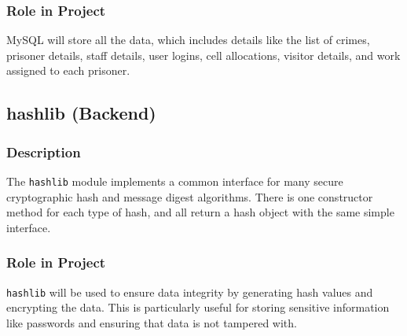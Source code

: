 \subsubsection{Role in Project}
MySQL will store all the data, which includes details like the list of crimes, prisoner details, staff details, user logins, cell allocations, visitor details, and work assigned to each prisoner.

\subsection*{hashlib (Backend)}

\subsubsection{Description}
The \texttt{hashlib} module implements a common interface for many secure cryptographic hash and message digest algorithms. There is one constructor method for each type of hash, and all return a hash object with the same simple interface.

\subsubsection{Role in Project}
\texttt{hashlib} will be used to ensure data integrity by generating hash values and encrypting the data. This is particularly useful for storing sensitive information like passwords and ensuring that data is not tampered with.